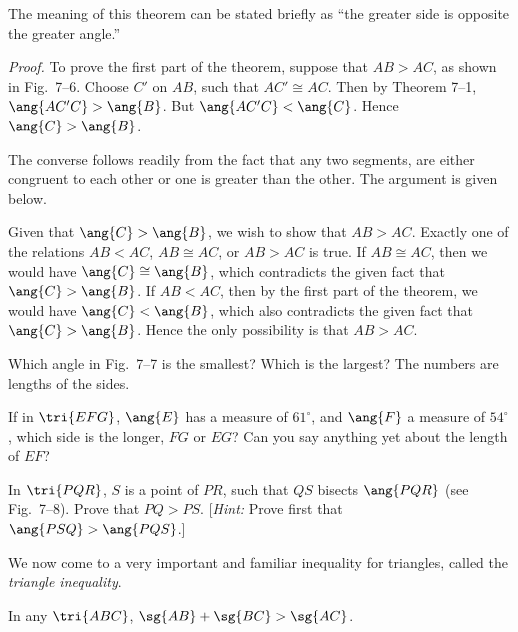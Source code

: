 \documentclass[11pt]{book}
\theoremstyle{bkplain}
\theoremstyle{XIplainnote}
\theoremstyle{bkplain}
\theoremstyle{bkplain}
\begin{document}
\begin{remark}
The meaning of this theorem can be stated briefly as ``the greater side is
opposite the greater angle.''
\end{remark}

\FIGVIISIX

\noindent\emph{Proof.}\quad
To prove the first part of the theorem, suppose that $AB > AC$, as shown in
Fig.~7--6. Choose $C'$ on $AB$, such that $AC' \cong AC$. Then by
Theorem 7--1, $\ang{AC'C} > \ang{B}$. But $\ang{AC'C} < \ang{C}$. Hence
$\ang{C} > \ang{B}$.

The converse follows readily from the fact that any two segments, are either
congruent to each other or one is greater than the other. The argument is given
below.

Given that $\ang{C} > \ang{B}$, we wish to show that $AB > AC$. Exactly one of
the relations $AB < AC$, $AB \cong AC$, or $AB > AC$ is true. If
$AB \cong AC$, then we would have $\ang{C} \cong \ang{B}$, which contradicts
the given fact that $\ang{C} > \ang{B}$. If $AB < AC$, then by the first part
of the theorem, we would have $\ang{C} < \ang{B}$, which also contradicts the
given fact that $\ang{C} > \ang{B}$. Hence the only possibility is that
$AB > AC$.

\begin{exercisecols}
\begin{exlist}
\item Which angle in Fig.~7--7 is the smallest? Which is the largest? The
  numbers are lengths of the sides.
\exfig{\FIGVIISEVEN}
\item If in $\tri{EFG}$, $\ang{E}$ has a measure of $61^\circ$, and $\ang{F}$ a
  measure of $54^\circ$, which side is the longer, $FG$ or $EG$? Can you say
  anything yet about the length of $EF$?
\item In $\tri{PQR}$, $S$ is a point of $PR$, such that $QS$ bisects
  $\ang{PQR}$ (see Fig.~7--8). Prove that $PQ > PS$. [\emph{Hint:} Prove first
  that $\ang{PSQ} > \ang{PQS}$.]
\exfig{\FIGVIIEIGHT}
\end{exlist}
\end{exercisecols}

We now come to a very important and familiar inequality for triangles, called
the \emph{triangle inequality}.

\begin{theorem}
In any $\tri{ABC}$, $\sg{AB} + \sg{BC} > \sg{AC}$.
\end{theorem}
\end{document}
